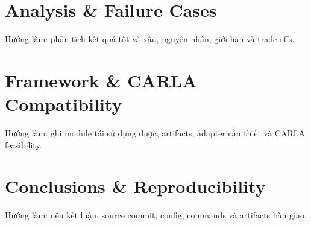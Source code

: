 \section{Analysis \& Failure Cases}

Hướng làm: phân tích kết quả tốt và xấu, nguyên nhân, giới hạn và trade-offs.

\section{Framework \& CARLA Compatibility}

Hướng làm: ghi module tái sử dụng được, artifacts, adapter cần thiết và CARLA feasibility.

\section{Conclusions \& Reproducibility}

Hướng làm: nêu kết luận, source commit, config, commands và artifacts bàn giao.
